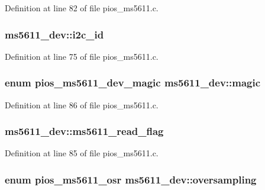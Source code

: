 Definition at line 82 of file pios\-\_\-ms5611.\-c.

\hypertarget{structms5611__dev_a6a0abf07d8e11d823c152aed1a7cbf76}{
\subsubsection[{i2c\-\_\-id}]{ ms5611\-\_\-dev\-::i2c\-\_\-id}}\label{structms5611__dev_a6a0abf07d8e11d823c152aed1a7cbf76}


Definition at line 75 of file pios\-\_\-ms5611.\-c.

\hypertarget{structms5611__dev_af378d71dd80bc5c444c6a3516036664f}{
\subsubsection[{magic}]{\setlength{\rightskip}{0pt plus 5cm}enum {\bf pios\-\_\-ms5611\-\_\-dev\-\_\-magic} ms5611\-\_\-dev\-::magic}}\label{structms5611__dev_af378d71dd80bc5c444c6a3516036664f}


Definition at line 86 of file pios\-\_\-ms5611.\-c.

\hypertarget{structms5611__dev_a207a039805c1ce6f2751655e7d5f7301}{
\subsubsection[{ms5611\-\_\-read\-\_\-flag}]{ ms5611\-\_\-dev\-::ms5611\-\_\-read\-\_\-flag}}\label{structms5611__dev_a207a039805c1ce6f2751655e7d5f7301}


Definition at line 85 of file pios\-\_\-ms5611.\-c.

\hypertarget{structms5611__dev_a0283041db42336e9ebe601eba710bdb3}{
\subsubsection[{oversampling}]{\setlength{\rightskip}{0pt plus 5cm}enum {\bf pios\-\_\-ms5611\-\_\-osr} ms5611\-\_\-dev\-::oversampling}}\label{structms5611__dev_a0283041db42336e9ebe601eba710bdb3}


